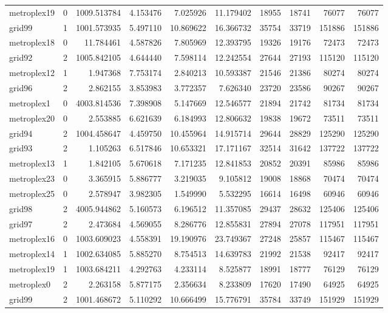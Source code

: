 \begin{longtable}{|l|r|r|r|r|r|r|r|r|r|}
metroplex19 & 0 & 1009.513784 & 4.153476 & 7.025926 & 11.179402 & 18955 & 18741 & 76077 & 76077 \\
grid99 & 1 & 1001.573935 & 5.497110 & 10.869622 & 16.366732 & 35754 & 33719 & 151886 & 151886 \\
metroplex18 & 0 & 11.784461 & 4.587826 & 7.805969 & 12.393795 & 19326 & 19176 & 72473 & 72473 \\
grid92 & 2 & 1005.842105 & 4.644440 & 7.598114 & 12.242554 & 27644 & 27193 & 115120 & 115120 \\
metroplex12 & 1 & 1.947368 & 7.753174 & 2.840213 & 10.593387 & 21546 & 21386 & 80274 & 80274 \\
grid96 & 2 & 2.862155 & 3.853983 & 3.772357 & 7.626340 & 23720 & 23586 & 90267 & 90267 \\
metroplex1 & 0 & 4003.814536 & 7.398908 & 5.147669 & 12.546577 & 21894 & 21742 & 81734 & 81734 \\
metroplex20 & 0 & 2.553885 & 6.621639 & 6.184993 & 12.806632 & 19838 & 19672 & 73511 & 73511 \\
grid94 & 2 & 1004.458647 & 4.459750 & 10.455964 & 14.915714 & 29644 & 28829 & 125290 & 125290 \\
grid93 & 2 & 1.105263 & 6.517846 & 10.653321 & 17.171167 & 32514 & 31642 & 137722 & 137722 \\
metroplex13 & 1 & 1.842105 & 5.670618 & 7.171235 & 12.841853 & 20852 & 20391 & 85986 & 85986 \\
metroplex23 & 0 & 3.365915 & 5.886777 & 3.219035 & 9.105812 & 19008 & 18868 & 70474 & 70474 \\
metroplex25 & 0 & 2.578947 & 3.982305 & 1.549990 & 5.532295 & 16614 & 16498 & 60946 & 60946 \\
grid98 & 2 & 4005.944862 & 5.160573 & 6.196512 & 11.357085 & 29437 & 28632 & 125406 & 125406 \\
grid97 & 2 & 2.473684 & 4.569055 & 8.286776 & 12.855831 & 27894 & 27078 & 117951 & 117951 \\
metroplex16 & 0 & 1003.609023 & 4.558391 & 19.190976 & 23.749367 & 27248 & 25857 & 115467 & 115467 \\
metroplex14 & 1 & 1002.634085 & 5.885270 & 8.754513 & 14.639783 & 21992 & 21538 & 92417 & 92417 \\
metroplex19 & 1 & 1003.684211 & 4.292763 & 4.233114 & 8.525877 & 18991 & 18777 & 76129 & 76129 \\
metroplex0 & 2 & 2.263158 & 5.877175 & 2.356634 & 8.233809 & 17620 & 17490 & 64925 & 64925 \\
grid99 & 2 & 1001.468672 & 5.110292 & 10.666499 & 15.776791 & 35784 & 33749 & 151929 & 151929 \\

\end{longtable}
